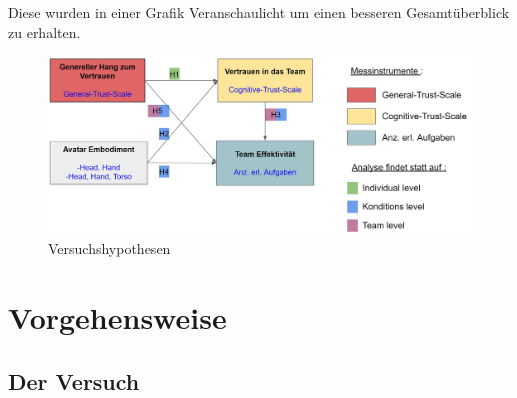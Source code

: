 \documentclass[a4paper,11pt]{article}%
\renewcommand{\\}{\vspace*{0.5\baselineskip} \newline}
\begin{document}
%


Diese wurden in einer Grafik Veranschaulicht um einen besseren Gesamtüberblick zu erhalten.

\begin{figure}[H]
		\begin{footnotesize}
			\includegraphics[width=\textwidth]{Abbildungen/Versuchshypothesen_02.JPG}\\
			\caption{Versuchshypothesen}
			\label{Versuchshypothesen}
		\end{footnotesize}
	\end{figure}	

\newpage
	\section{Vorgehensweise}
	\subsection{Der Versuch}
\end{document}
